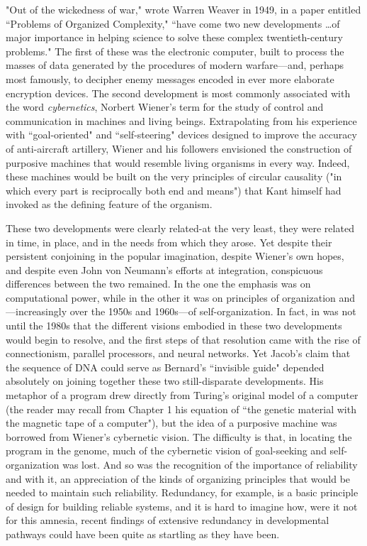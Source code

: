  
\begin{longquote}
"Out of the wickedness of war," wrote Warren Weaver in
1949, in a paper entitled ``Problems of Organized Complexity," ``have come two new developments \ldots of major importance in helping science to solve these complex twentieth-century problems." The first of these was the electronic
computer, built to process the masses of data generated
by the procedures of modern warfare—and, perhaps most
famously, to decipher enemy messages encoded in ever
more elaborate encryption devices. The second development is most commonly associated with the word \textit{cybernetics}, Norbert Wiener's term for the study of control and communication in machines and living beings. Extrapolating
from his experience with ``goal-oriented" and ``self-steering"
devices designed to improve the accuracy of anti-aircraft artillery, Wiener and his followers envisioned the construction
of purposive machines that would resemble living organisms in every way. Indeed, these machines would be built on
the very principles of circular causality ("in which every part
is reciprocally both end and means") that Kant himself had
invoked as the defining feature of the organism.

These two developments were clearly related-at the very
least, they were related in time, in place, and in the needs
from which they arose. Yet despite their persistent conjoining in the popular imagination, despite Wiener's own
hopes, and despite even John von Neumann's efforts at integration, conspicuous differences between the two remained.
In the one the emphasis was on computational power, while
in the other it was on principles of organization and—increasingly over the 1950s and 1960s—of self-organization. 
In fact, in was not until the 1980s that the different visions
embodied in these two developments would begin to resolve, and the first steps of that resolution came with the
rise of connectionism, parallel processors, and neural networks. Yet Jacob’s claim that the sequence of DNA could
serve as Bernard’s ``invisible guide" depended absolutely on
joining together these two still-disparate developments. His
metaphor of a program drew directly from Turing’s original
model of a computer (the reader may recall from Chapter 1
his equation of ``the genetic material with the magnetic tape
of a computer"), but the idea of a purposive machine was
borrowed from Wiener's cybernetic vision. The difficulty is
that, in locating the program in the genome, much of the
cybernetic vision of goal-seeking and self-organization was
lost. And so was the recognition of the importance of reliability and with it, an appreciation of the kinds of organizing principles that would be needed to maintain such reliability. Redundancy, for example, is a basic principle of
design for building reliable systems, and it is hard to imagine how, were it not for this amnesia, recent findings of extensive redundancy in developmental pathways could have been quite as startling as they have been.
\cite[p.109-111]{Keller2000}
\end{longquote}

